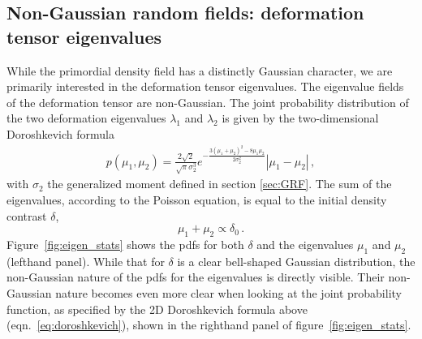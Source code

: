 \documentclass[a4paper, 11pt]{article}
\begin{document}
\subsection{Non-Gaussian random fields: deformation tensor eigenvalues}
While the primordial density field has a distinctly Gaussian character, we are primarily interested in the deformation tensor eigenvalues. The eigenvalue fields of the deformation tensor are non-Gaussian. The joint probability distribution of the two deformation eigenvalues $\lambda_1$ and $\lambda_2$ is given by the two-dimensional Doroshkevich formula \cite{Doroshkevich:1970, Feldbrugge:2014}
\begin{align}
  p(\mu_1,\mu_2) = \frac{2\sqrt{2}}{\sqrt{\pi} \sigma_2^3} e^{-\frac{3(\mu_1+\mu_2)^2-8\mu_1 \mu_2}{2 \sigma_2^2}}|\mu_1-\mu_2|\,,
  \label{eq:doroshkevich}
\end{align}
with $\sigma_2$ the generalized moment defined in section \ref{sec:GRF}. The sum of the eigenvalues, according to the Poisson equation, is equal to the initial density contrast $\delta$,
\begin{equation}
\mu_1+\mu_2 \propto \delta_0\,.
\end{equation}
Figure~\ref{fig:eigen_stats} shows the pdfs for both $\delta$ and the eigenvalues $\mu_1$ and $\mu_2$ (lefthand panel). While that for $\delta$ is a clear bell-shaped Gaussian distribution, the non-Gaussian nature of the pdfs for the eigenvalues is directly visible. Their non-Gaussian nature becomes even more clear when looking at the joint probability function, as specified by the 2D Doroshkevich formula above (eqn.\ \eqref{eq:doroshkevich}), shown in the righthand panel of figure~\ref{fig:eigen_stats}.
\end{document}
